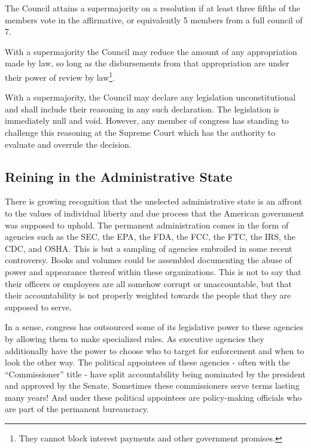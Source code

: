 \documentclass{article}
\newcommand{\quotes}[1]{``#1''}
\begin{document}
\begin{quoting}
The Council attains a supermajority on a resolution if at least three fifths of the members vote in the affirmative, or equivalently 5 members from a full council of 7.

With a supermajority the Council may reduce the amount of any appropriation made by law, so long as the disbursements from that appropriation are under their power of review by law\footnote{They cannot block interest payments and other government promises.}.

With a supermajority, the Council may declare any legislation unconstitutional and shall include their reasoning in any such declaration. The legislation is immediately null and void. However, any member of congress has standing to challenge this reasoning at the Supreme Court which has the authority to evaluate and overrule the decision.
\end{quoting}

\subsection{Reining in the Administrative State}

There is growing recognition that the unelected administrative state is an affront to the values of individual liberty and due process that the American government was supposed to uphold. The permanent administration comes in the form of agencies such as the SEC, the EPA, the FDA, the FCC, the FTC, the IRS, the CDC, and OSHA. This is but a sampling of agencies embroiled in some recent controversy. Books and volumes could be assembled documenting the abuse of power and appearance thereof within these organizations. This is not to say that their officers or employees are all somehow corrupt or unaccountable, but that their accountability is not properly weighted towards the people that they are supposed to serve.

In a sense, congress has outsourced some of its legislative power to these agencies by allowing them to make specialized rules. As executive agencies they additionally have the power to choose who to target for enforcement and when to look the other way. The political appointees of these agencies - often with the \quotes{Commissioner} title - have split accountability being nominated by the president and approved by the Senate. Sometimes these commissioners serve terms lasting many years! And under these political appointees are policy-making officials who are part of the permanent bureaucracy.
\end{document}
